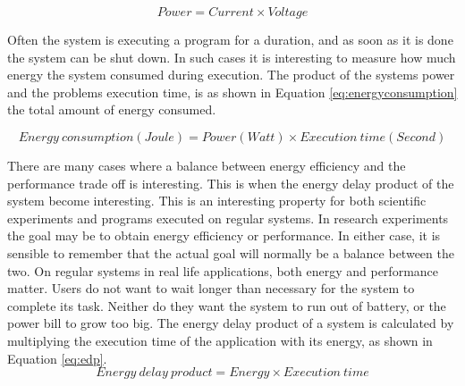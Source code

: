 \begin{equation} \label{eq:powerconsumptionbackground}
  Power = Current \times Voltage
\end{equation}

Often the system is executing a program for a duration, and as soon as it is done the system can be shut down.
In such cases it is interesting to measure how much energy the system consumed during execution.
The product of the systems power and the problems execution time, is as shown in Equation \ref{eq:energyconsumption} the total amount of energy consumed.

\begin{equation} \label{eq:energyconsumption}
  Energy\ consumption (Joule) = Power (Watt) \times Execution\ time (Second)
\end{equation}

There are many cases where a balance between energy efficiency and the performance trade off is interesting.
This is when the energy delay product of the system become interesting.
This is an interesting property for both scientific experiments and programs executed on regular systems.
In research experiments the goal may be to obtain energy efficiency or performance.
In either case, it is sensible to remember that the actual goal will normally be a balance between the two.
On regular systems in real life applications, both energy and performance matter.
Users do not want to wait longer than necessary for the system to complete its task.
Neither do they want the system to run out of battery, or the power bill to grow too big.
The energy delay product of a system is calculated by multiplying the execution time of the application with its energy, as shown in Equation \ref{eq:edp}.
\begin{equation} \label{eq:edp}
  Energy\ delay\ product = Energy \times Execution\ time
\end{equation}

